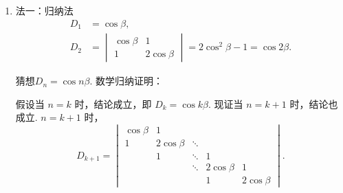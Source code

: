 \documentclass[12pt,fontset=fandol]{ctexart}
\begin{document}
\begin{solve}
\begin{enumerate}
        \item 法一：归纳法
            \begin{align*}
                D_1 & =\cos\beta,                               \\
                D_2 & =\begin{vmatrix}
                            \cos\beta & 1          \\
                            1         & 2\cos\beta
                        \end{vmatrix}=2\cos^2\beta-1=\cos2\beta.
            \end{align*}

            猜想$D_n=\cos n\beta$. 数学归纳证明：

            假设当 $n=k$ 时，结论成立，即 $D_{k}=\cos k \beta$. 现证当 $n=k+1$ 时，结论也成立. $ n=k+1 $ 时，
            \[ D_{k+1} = \begin{vmatrix}
                    \cos \beta & 1            &        &              &              \\
                    1          & 2 \cos \beta & \ddots &              &              \\
                                & 1            & \ddots & 1            &              \\
                                &              & \ddots & 2 \cos \beta & 1            \\
                                &              &        & 1            & 2 \cos \beta
                \end{vmatrix}. \]


\end{enumerate}
\end{solve}
\end{document}
